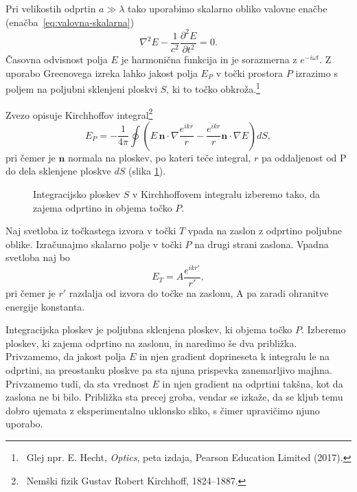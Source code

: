 Pri velikostih odprtin $a\gg\lambda$ tako uporabimo skalarno obliko valovne enačbe 
(enačba~\ref{eq:valovna-skalarna})
\begin{equation}
\nabla^2 E - \frac{1}{c^2}\frac{\partial^2 E}{\partial t^2} = 0.
\label{eq:skalarna-valovna-enačba}
\end{equation}
Časovna odvisnost polja $E$ je harmonična funkcija in 
je sorazmerna z $e^{-i \omega t}$. Z uporabo Greeno\-ve\-ga izreka lahko
jakost polja $E_P$ v točki prostora $P$ izrazimo s poljem na 
poljubni sklenjeni ploskvi $S$, ki to točko obkroža.\footnote{~Glej npr. 
E. Hecht, {\it Optics}, peta izdaja, Pearson Education Limited (2017).} 

Zvezo opisuje Kirchhoffov integral\footnote{~Nemški fizik Gustav Robert Kirchhoff, 1824--1887.} 
\begin{equation}
E_P = -\frac{1}{4\pi}\oint \left(E\,\mathbf{n}\cdot \nabla \frac{e^{ikr}}{r}-
\frac{e^{ikr}}{r}\mathbf{n}\cdot \nabla E \right) dS,
\label{eq:Kirchhoffov-integral}
\end{equation}
pri čemer je $\mathbf{n}$ normala na ploskev, po kateri teče integral, $r$ pa oddaljenost od P
do dela sklenjene ploskve $dS$ (slika \ref{fig:UklonFK}). 
\begin{figure}[ht]
\centering {} 
  
\caption{Integracijsko ploskev $S$ v Kirchhoffovem integralu izberemo tako, da zajema odprtino 
in objema točko $P$.}
\label{fig:UklonFK}
\end{figure}

Naj svetloba iz točkastega izvora v točki $T$ vpada na zaslon
z odprtino poljubne oblike. Izračunajmo skalarno polje v točki $P$ na drugi 
strani zaslona. Vpadna svetloba naj bo
\begin{equation}
\label{eq:polje-krogelni-val}
E_T = A \frac{e^{ikr'}}{r'},
\end{equation}
pri čemer je $r'$ razdalja od izvora do točke na zaslonu, A pa zaradi ohranitve energije konstanta.

Integracijska ploskev je poljubna sklenjena ploskev, ki objema točko $P$. 
Izberemo ploskev, ki zajema odprtino na zaslonu, in naredimo še dva približka. Privzamemo, da
jakost polja $E$ in njen gradient doprineseta k integralu le na odprtini, na preostanku ploskve
pa sta njuna prispevka zanemarljivo majhna. Privzamemo tudi, da sta vrednost $E$ in njen gradient 
na odprtini takšna, kot da zaslona ne bi bilo.
Približka sta precej groba, vendar se izkaže, da se kljub temu
dobro ujemata z eksperimentalno uklonsko sliko, s čimer 
upravičimo njuno uporabo.

